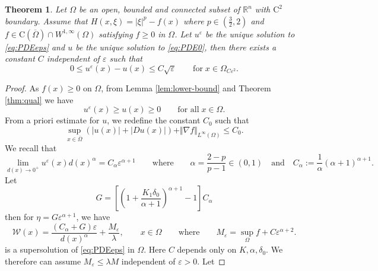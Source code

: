 \documentclass[11pt,reqno]{amsart}
\numberwithin{figure}{section}
\theoremstyle{plain}
\newtheorem{thm}{Theorem}[section]
\theoremstyle{remark}
\numberwithin{equation}{section}
\newcommand{\R}{\mathbb{R}}
\begin{document}
\begin{thm}\label{thm:rate_doubling0} Let $\Omega$ be an open, bounded and connected subset of $\R^n$ with $\mathrm{C}^2$ boundary. Assume that $H(x,\xi) = |\xi|^p - f(x)$ where $p\in\left(\frac{3}{2},2\right)$ and $f\in \mathrm{C}(\overline{\Omega})\cap W^{1,\infty}(\Omega)$ satisfying $f\geq 0$ in $\Omega$. Let $u^\varepsilon$ be the unique solution to \eqref{eq:PDEeps} and $u$ be the unique solution to \eqref{eq:PDE0}, then there exists a constant $C$ independent of $\varepsilon$ such that
\begin{equation*}
    0\leq u^\varepsilon(x) - u(x) \leq C\sqrt{\varepsilon} \qquad\text{for}\;x\in \Omega_{C\varepsilon^2}.
\end{equation*}
\end{thm}
\begin{proof} As $f(x)\geq 0$ on $\Omega$, from Lemma \ref{lem:lower-bound} and Theorem \ref{thm:qual} we have 
\begin{equation}\label{e:low}
    u^\varepsilon(x) \geq u(x) \geq 0 \qquad\text{for all}\;x\in \Omega.
\end{equation}
From a priori estimate for $u$, we redefine the constant $C_0$ such that
\begin{equation}\label{e:priori}
    \sup_{x\in \overline{\Omega}} \left(\left| u(x)\right| + \left|Du(x)\right|\right) + \Vert \nabla f\Vert_{L^\infty(\Omega)} \leq C_0.
\end{equation}
We recall that
\begin{equation}\label{e:behavior_ueps}
    \lim_{d(x)\to 0^+} u^\varepsilon(x)d(x)^\alpha = C_\alpha \varepsilon^{\alpha+1} \qquad\text{where}\qquad \alpha = \frac{2-p}{p-1} \in (0,1) \quad\text{and}\quad C_\alpha := \frac{1}{\alpha}(\alpha+1)^{\alpha+1}.
\end{equation}
Let 
\begin{equation*}
    G = \left[\left(1+\frac{K_1\delta_0}{\alpha+1}\right)^{\alpha+1} - 1\right]C_\alpha 
\end{equation*}
then for $\eta = G\varepsilon^{\alpha+1}$, we have 
\begin{equation*}
    \mathcal{W}(x) = \frac{(C_\alpha+G)\varepsilon}{d(x)^\alpha} + \frac{M_\varepsilon}{\lambda}, \qquad x\in \Omega \qquad\text{where}\qquad M_\varepsilon = \sup_{\Omega} f + C\varepsilon^{\alpha+2}.
\end{equation*}
is a supersolution of \eqref{eq:PDEeps} in $\Omega$. Here $C$ depends only on $K,\alpha,\delta_0$. We therefore can assume $M_\varepsilon\leq \lambda M$ independent of $\varepsilon>0$. Let 

\end{proof}
\end{document}
